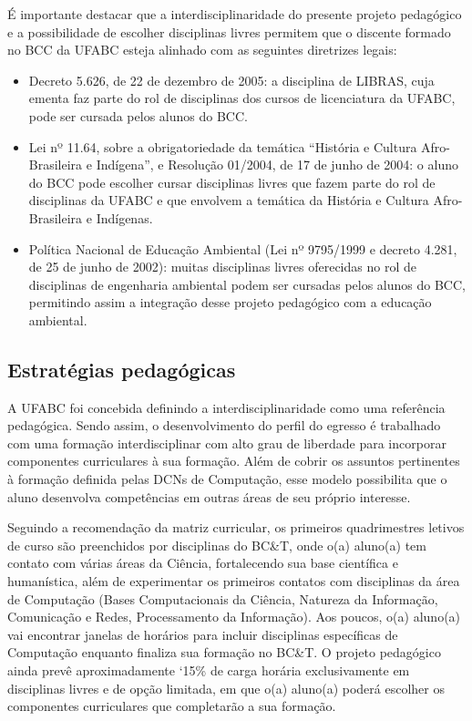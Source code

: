 É importante destacar que a interdisciplinaridade do presente projeto
pedagógico e a possibilidade de escolher disciplinas livres permitem que o
discente formado no BCC da UFABC esteja alinhado com as seguintes diretrizes
legais:
\begin{itemize}
    \item Decreto 5.626, de 22 de dezembro de 2005: a disciplina de LIBRAS,
    cuja ementa faz parte do rol de disciplinas dos cursos de licenciatura da
    UFABC, pode ser cursada pelos alunos do BCC.
    
    \item Lei nº 11.64, sobre a obrigatoriedade da temática ``História e
    Cultura Afro-Brasileira e Indígena'', e Resolução 01/2004, de 17 de junho
    de 2004: o aluno do BCC pode escolher cursar disciplinas livres que fazem
    parte do rol de disciplinas da UFABC e que envolvem a temática da História
    e Cultura Afro-Brasileira e Indígenas.
    
    \item Política Nacional de Educação Ambiental (Lei nº 9795/1999 e decreto
    4.281, de 25 de junho de 2002): muitas disciplinas livres oferecidas no rol
    de disciplinas de engenharia ambiental podem ser cursadas pelos alunos do
    BCC, permitindo assim a integração desse projeto pedagógico com a educação
    ambiental.
\end{itemize}



\subsection{Estratégias pedagógicas}

A UFABC foi concebida definindo a interdisciplinaridade como uma referência
pedagógica.
Sendo assim, o desenvolvimento do perfil do egresso é trabalhado com uma
formação interdisciplinar com alto grau de liberdade para incorporar
componentes curriculares à sua formação.
Além de cobrir os assuntos pertinentes à formação definida pelas DCNs de
Computação, esse modelo possibilita que o aluno desenvolva competências em
outras áreas de seu próprio interesse.

Seguindo a recomendação da matriz curricular, os primeiros quadrimestres
letivos de curso são preenchidos por disciplinas do BC\&T, onde o(a) aluno(a)
tem contato com várias áreas da Ciência, fortalecendo sua base científica e
humanística, além de experimentar os primeiros contatos com disciplinas da área
de Computação (Bases Computacionais da Ciência, Natureza da Informação,
Comunicação e Redes, Processamento da Informação).
Aos poucos, o(a) aluno(a) vai encontrar janelas de horários para incluir
disciplinas específicas de Computação enquanto finaliza sua formação no BC\&T.
O projeto pedagógico ainda prevê aproximadamente \red`{15\%} de carga horária exclusivamente 
em disciplinas livres e de opção limitada, em que o(a) aluno(a) poderá escolher os componentes
curriculares que completarão a sua formação.


